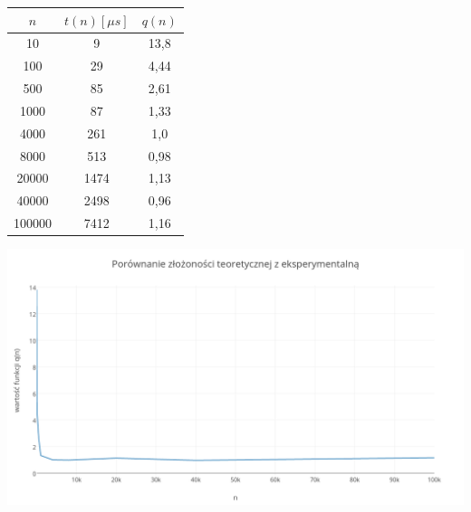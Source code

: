 \documentclass{article}
\begin{document}
	\begin{center}
		\begin{tabular}{c c c}
			\toprule
				$n$ & $t(n) [\mu s]$ & $q(n) $\\
			\midrule
				10 & 9 & 13,8 \\
				100 & 29 & 4,44 \\
				500 & 85 & 2,61 \\
				1000 & 87 & 1,33 \\
			\midrule
				4000 & 261 & 1,0 \\
			\midrule
				8000 & 513 & 0,98 \\
				20000 & 1474 & 1,13 \\
				40000 & 2498 & 0,96 \\
				100000 & 7412 & 1,16 \\
			\bottomrule
		\end{tabular}

		\vspace{3cm}
		\includegraphics[width=\textwidth]{plot.png}
	\end{center}
\end{document}
